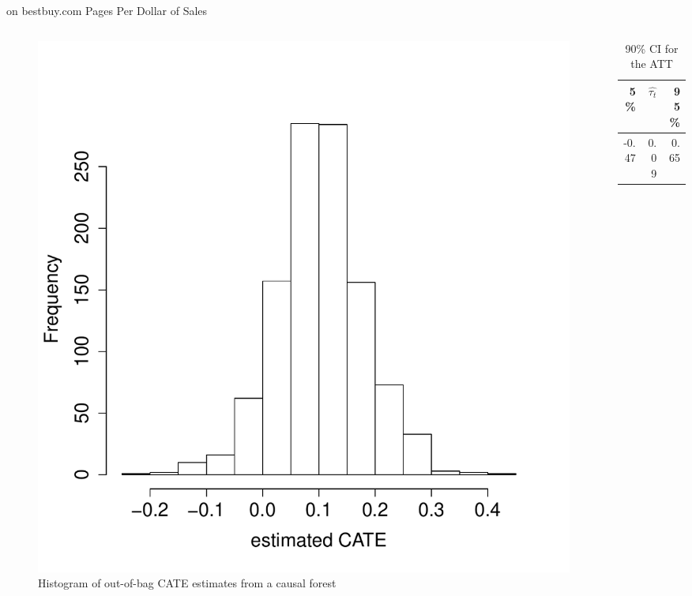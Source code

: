 \documentclass[mathserif, xcolor=table]{beamer}
\begin{document}
\begin{frame}{on bestbuy.com Pages Per Dollar of Sales}
\vspace{-1em}
\begin{columns}
\begin{column}{.6\textwidth}
 \begin{figure}[h]
    \centering
    \includegraphics[scale=0.3]{figures/tauhat3_bb_hist.pdf}
    \caption{ Histogram of out-of-bag CATE estimates from a causal forest}
    \label{fig:tauhat3_bb_hist}
\end{figure}
 \end{column}
 
 \begin{column}{.39\textwidth}
\begin{table}[h]
\caption{90\% CI for the ATT} 
\centering
\begin{tabular}{rrr}
  \hline
 5\%  & $\hat{\tau_t}$ & 95\% \\ 
  \hline
 -0.47 & 0.09 & 0.65 \\ 
   \hline
\end{tabular}
\end{table}
 \end{column}
\end{columns}
\end{frame}
\end{document}
